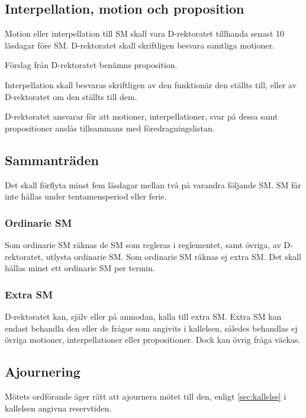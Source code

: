 \documentclass[a4paper,12pt]{article}
\begin{document}
\subsection{Interpellation, motion och proposition}

Motion eller interpellation till SM skall vara D-rektoratet tillhanda senast 10 läsdagar före SM. D-rektoratet skall skriftligen besvara samtliga motioner.

Förslag från D-rektoratet benämns proposition.

Interpellation skall besvaras skriftligen av den funktionär den ställts till, eller av D-rektoratet om den ställts till dem.

D-rektoratet ansvarar för att motioner, interpellationer, svar på dessa samt propositioner anslås tillsammans med föredragningslistan.

\subsection{Sammanträden}

Det skall förflyta minst fem läsdagar mellan två på varandra följande SM. SM får inte hållas under tentamensperiod eller ferie.

\subsubsection{Ordinarie SM}
\label{sec:ordinarie_sm}

Som ordinarie SM räknas de SM som regleras i reglementet, samt övriga, av D-rektoratet, utlysta ordinarie SM. Som ordinarie SM räknas ej extra SM. Det skall hållas minst ett ordinarie SM per termin.

\subsubsection{Extra SM}

D-rektoratet kan, själv eller på anmodan, kalla till extra SM. Extra SM kan endast behandla den eller de frågor som angivits i kallelsen, således behandlas ej övriga motioner, interpellationer eller propositioner. Dock kan övrig fråga väckas.

\subsection{Ajournering}
\label{sec:ajournering}

Mötets ordförande äger rätt att ajournera mötet till den, enligt 
\ref{sec:kallelse} i kallelsen angivna reservtiden.
\end{document}
